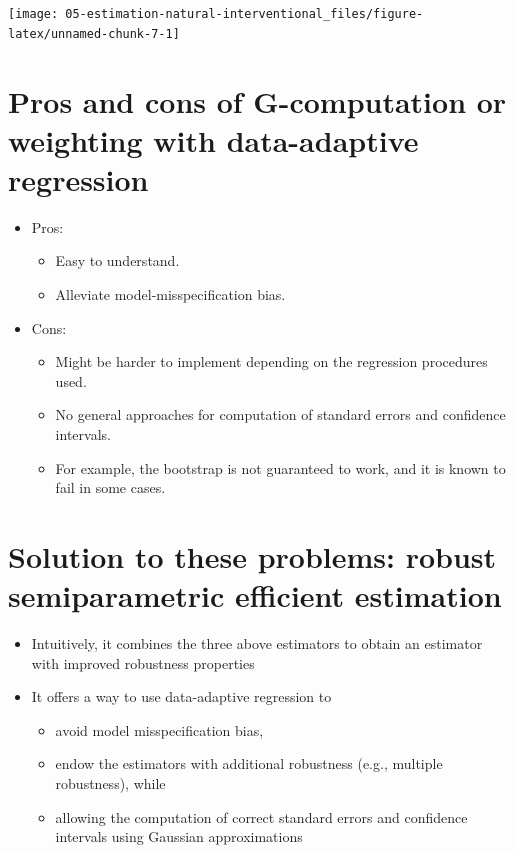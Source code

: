 \documentclass[
  12pt,
]{book}
\providecommand{\tightlist}{%
  \setlength{\itemsep}{0pt}\setlength{\parskip}{0pt}}
\theoremstyle{definition}
\theoremstyle{definition}
\theoremstyle{definition}
\newcommand{\1}{\mathbbm{1}}
\begin{document}
\begin{center}\texttt{[image: 05-estimation-natural-interventional\_files/figure-latex/unnamed-chunk-7-1]} \end{center}

\hypertarget{pros-and-cons-of-g-computation-or-weighting-with-data-adaptive-regression}{%
\section{Pros and cons of G-computation or weighting with data-adaptive regression}\label{pros-and-cons-of-g-computation-or-weighting-with-data-adaptive-regression}}

\begin{itemize}
\tightlist
\item
  Pros:

  \begin{itemize}
  \tightlist
  \item
    Easy to understand.
  \item
    Alleviate model-misspecification bias.
  \end{itemize}
\item
  Cons:

  \begin{itemize}
  \tightlist
  \item
    Might be harder to implement depending on the regression procedures used.
  \item
    No general approaches for computation of standard errors and confidence
    intervals.
  \item
    For example, the bootstrap is not guaranteed to work, and it is known to
    fail in some cases.
  \end{itemize}
\end{itemize}

\hypertarget{solution-to-these-problems-robust-semiparametric-efficient-estimation}{%
\section{Solution to these problems: robust semiparametric efficient estimation}\label{solution-to-these-problems-robust-semiparametric-efficient-estimation}}

\begin{itemize}
\tightlist
\item
  Intuitively, it combines the three above estimators to obtain an
  estimator with improved robustness properties
\item
  It offers a way to use data-adaptive regression to

  \begin{itemize}
  \tightlist
  \item
    avoid model misspecification bias,
  \item
    endow the estimators with additional robustness (e.g., multiple robustness),
    while
  \item
    allowing the computation of correct standard errors and confidence
    intervals using Gaussian approximations
  \end{itemize}
\end{itemize}
\end{document}
